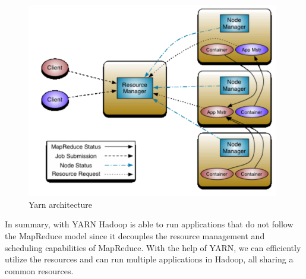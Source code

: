 \begin{figure}[H]
	\includegraphics[width=110mm, keepaspectratio]{figures/yarn.png}
	\centering
	\caption{Yarn architecture}
	\centering
\end{figure}

In summary, with YARN Hadoop is able to run applications that do not follow the MapReduce model since it decouples the resource management and scheduling capabilities of MapReduce. With the help of YARN, we can efficiently utilize the resources and can run multiple applications in Hadoop, all sharing a common resources.